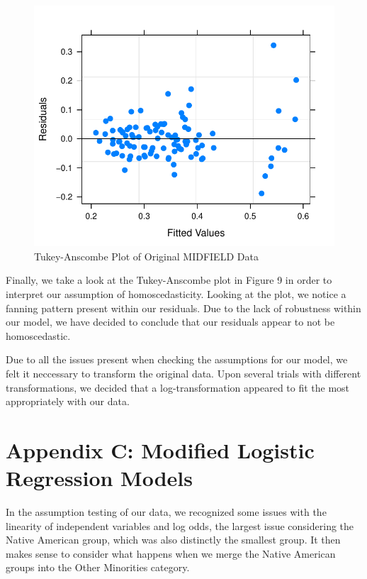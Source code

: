 \documentclass[]{article}
\begin{document}
\begin{figure}
\centering
\includegraphics{Stat_461_Final_Project_Report_files/figure-latex/homoscedasticity-1.pdf}
\caption{Tukey-Anscombe Plot of Original MIDFIELD Data}
\end{figure}

Finally, we take a look at the Tukey-Anscombe plot in Figure 9 in order
to interpret our assumption of homoscedasticity. Looking at the plot, we
notice a fanning pattern present within our residuals. Due to the lack
of robustness within our model, we have decided to conclude that our
residuals appear to not be homoscedastic.

Due to all the issues present when checking the assumptions for our
model, we felt it neccessary to transform the original data. Upon
several trials with different transformations, we decided that a
log-transformation appeared to fit the most appropriately with our data.

\newpage

\section{Appendix C: Modified Logistic Regression
Models}\label{appendix-c-modified-logistic-regression-models}

In the assumption testing of our data, we recognized some issues with
the linearity of independent variables and log odds, the largest issue
considering the Native American group, which was also distinctly the
smallest group. It then makes sense to consider what happens when we
merge the Native American groups into the Other Minorities category.
\end{document}
